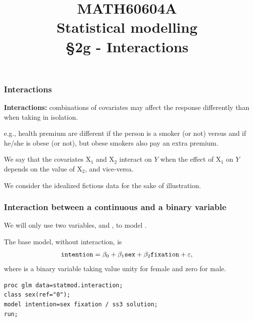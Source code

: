 \documentclass{beamer}
\title[\color{white}{MATH60604A Interactions}]{\texorpdfstring{MATH60604A \\Statistical modelling \\ \S 2g - Interactions}{MATH60604A \\Statistical modelling \\ \S~2g - Interactions}}
\author{}
\institute{HEC Montréal\\
Department of Decision Sciences}
\date{}
\begin{document}
\frame{\titlepage}

\begin{frame}
 \frametitle{Interactions}
 \bi 
 \item \textbf{Interactions:} combinations of covariates may affect the response differently than  when taking in isolation.
 \item e.g., health premium are different if the person is a smoker (or not) versus and if he/she is obese (or not), but obese smokers also pay an extra premium.
\item We say that the covariates $\mathrm{X}_1$ and $\mathrm{X}_2$ interact on $Y$ when \alert{the effect of $\mathrm{X}_1$ on $Y$ depends on the value of $\mathrm{X}_2$, and vice-versa}.
  \item We consider the idealized fictious data  for the sake of illustration.
  \ei
 \end{frame}
 
\begin{frame}[fragile]
\frametitle{Interaction between a continuous and a binary variable}
\bi
\item We will only use two variables,  and , to model . 
\item The base model, without interaction, is
\begin{align*}
\texttt{intention}=\beta_0 + \beta_1 \texttt{sex} + \beta_2 \texttt{fixation} + \varepsilon,
\end{align*}
where  is a binary variable taking value unity for female and zero for male.
\ei
\begin{tcolorbox}[colback=white,colframe=hecblue,title=\SASlang code to fit a linear model]
\begin{verbatim}
proc glm data=statmod.interaction;
class sex(ref="0");
model intention=sex fixation / ss3 solution;
run;
\end{verbatim}
\end{tcolorbox}
\end{frame}
\end{document}
